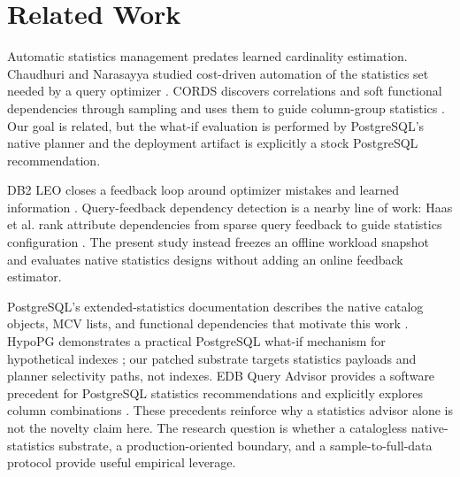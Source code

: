 \section{Related Work}

Automatic statistics management predates learned cardinality estimation.
Chaudhuri and Narasayya studied cost-driven automation of the statistics set
needed by a query optimizer \cite{ChaudhuriNarasayya2001}. CORDS discovers
correlations and soft functional dependencies through sampling and uses them
to guide column-group statistics \cite{Ilyas2004CORDS}. Our goal is related,
but the what-if evaluation is performed by PostgreSQL's native planner and the
deployment artifact is explicitly a stock PostgreSQL recommendation.

DB2 LEO closes a feedback loop around optimizer mistakes and learned
information \cite{Stillger2001LEO}. Query-feedback dependency detection is a
nearby line of work: Haas et al. rank attribute dependencies from sparse query
feedback to guide statistics configuration
\cite{Haas2007AttributeDependencies}. The present
study instead freezes an offline workload snapshot and evaluates native
statistics designs without adding an online feedback estimator.

PostgreSQL's extended-statistics documentation describes the native catalog
objects, MCV lists, and functional dependencies that motivate this work
\cite{PostgreSQL16Docs,PostgreSQL16Catalog}. HypoPG demonstrates a practical
PostgreSQL what-if mechanism for hypothetical indexes \cite{HypoPG}; our
patched substrate targets statistics payloads and planner selectivity paths,
not indexes. EDB Query Advisor provides a software precedent for PostgreSQL
statistics recommendations and explicitly explores column combinations
\cite{EDBQueryAdvisor}. These precedents reinforce why a statistics advisor
alone is not the novelty claim here. The research question is whether a
catalogless native-statistics substrate, a production-oriented boundary, and a
sample-to-full-data protocol provide useful empirical leverage.
